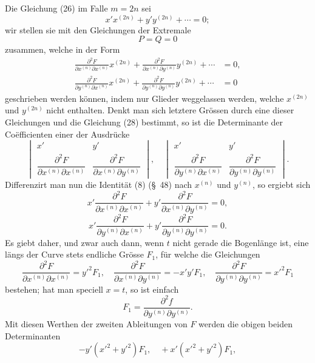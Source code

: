 \documentclass[11pt,a4paper,leqno]{article}
\begin{document}
Die Gleichung (26) im Falle $m=2n$ sei
\begin{equation}\tag{28}
x'x^{(2n)}+y'y^{(2n)}+\cdots=0;
\end{equation}
wir stellen sie mit den Gleichungen der Extremale
\[
P=Q=0
\]
zusammen, welche in der Form
\begin{equation}\tag{29}
\begin{aligned}
\frac{\partial^2F}{\partial x^{(n)}\partial x^{(n)}}x^{(2n)}
+\frac{\partial^2F}{\partial x^{(n)}\partial y^{(n)}}y^{(2n)}+\cdots&=0,\\
\frac{\partial^2F}{\partial y^{(n)}\partial x^{(n)}}x^{(2n)}
+\frac{\partial^2F}{\partial y^{(n)}\partial y^{(n)}}y^{(2n)}+\cdots&=0
\end{aligned}
\end{equation}
geschrieben werden können, indem nur Glieder weggelassen werden, welche $x^{(2n)}$ und $y^{(2n)}$ nicht enthalten. Denkt man sich letztere Grössen durch eine dieser Gleichungen und die Gleichung (28) bestimmt, so ist die Determinante der Coëfficienten einer der Ausdrücke
\[
\begin{vmatrix}
x'&y'\\
\dfrac{\partial^2F}{\partial x^{(n)}\partial x^{(n)}}&\dfrac{\partial^2F}{\partial x^{(n)}\partial y^{(n)}}
\end{vmatrix},\quad
\begin{vmatrix}
x'&y'\\
\dfrac{\partial^2F}{\partial y^{(n)}\partial x^{(n)}}&\dfrac{\partial^2F}{\partial y^{(n)}\partial y^{(n)}}
\end{vmatrix}.
\]
Differenzirt man nun die Identität (8) (\S~48) nach $x^{(n)}$ und $y^{(n)}$, so ergiebt sich
\[
x'\frac{\partial^2F}{\partial x^{(n)}\partial x^{(n)}}
+y'\frac{\partial^2F}{\partial x^{(n)}\partial y^{(n)}}=0,
\]
\[
x'\frac{\partial^2F}{\partial y^{(n)}\partial x^{(n)}}
+y'\frac{\partial^2F}{\partial y^{(n)}\partial y^{(n)}}=0.
\]
Es giebt daher, und zwar auch dann, wenn $t$ nicht gerade die Bogenlänge ist, eine längs der Curve stets endliche Grösse $F_1$, für welche die Gleichungen
\[
\frac{\partial^2F}{\partial x^{(n)}\partial x^{(n)}}=y'^2F_1,
\quad
\frac{\partial^2F}{\partial x^{(n)}\partial y^{(n)}}=-x'y'F_1,
\quad
\frac{\partial^2F}{\partial y^{(n)}\partial y^{(n)}}=x'^2F_1
\]
bestehen; hat man speciell $x=t$, so ist einfach
\[
F_1=\frac{\partial^2f}{\partial y^{(n)}\partial y^{(n)}}.
\]
Mit diesen Werthen der zweiten Ableitungen von $F$ werden die obigen beiden Determinanten
\[
-y'(x'^2+y'^2)F_1,
\quad
+x'(x'^2+y'^2)F_1,
\]
\end{document}
